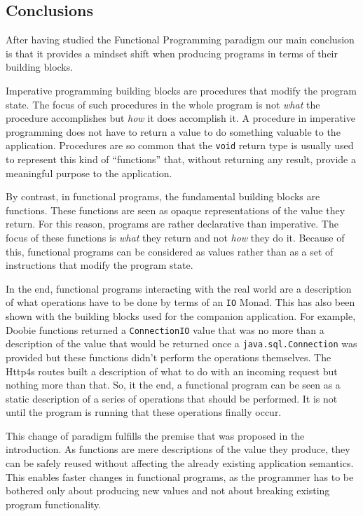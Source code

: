 \documentclass[../main.tex]{subfiles}
\begin{document}
\subsection{Conclusions}
After having studied the Functional Programming paradigm our main conclusion is
that it provides a mindset shift when producing programs in terms of their
building blocks.

Imperative programming building blocks are procedures that modify the program
state. The focus of such procedures in the whole program is not \textit{what} the
procedure accomplishes but \textit{how} it does accomplish it. A procedure in
imperative programming does not have to return a value to do something valuable
to the application. Procedures are so common that the \texttt{void} return type is usually used to
represent this kind of ``functions'' that, without returning any result, provide a
meaningful purpose to the application.

By contrast, in functional programs, the fundamental building blocks are functions. These
functions are seen as opaque representations of the value they return. For this
reason, programs are rather declarative than imperative. The focus of these
functions is \textit{what} they return and not \textit{how} they do it. Because of this,
functional programs can be considered as values rather than as a set of
instructions that modify the program state.

In the end, functional programs interacting with the real world are a description of what operations have to
be done by terms of an \texttt{IO} Monad. This has also been shown with the
building blocks used for the companion application. For example, Doobie functions
returned a \texttt{ConnectionIO} value that was no more than a description of
the value that would be returned once a \texttt{java.sql.Connection} was
provided but these functions didn't perform the operations themselves. The Http4s routes built a
description of what to do with an incoming request but nothing more than that. So,
it the end, a functional program can be seen as a static description of a series of
operations that should be performed. It is not until the program is running that these
operations finally occur.

This change of paradigm fulfills the premise that was proposed in the introduction. As
functions are mere descriptions of the value they produce, they can be safely
reused without affecting the already existing application semantics. This enables
faster changes in functional programs, as the programmer has to be bothered
only about producing new values and not about breaking existing program
functionality.
\end{document}
